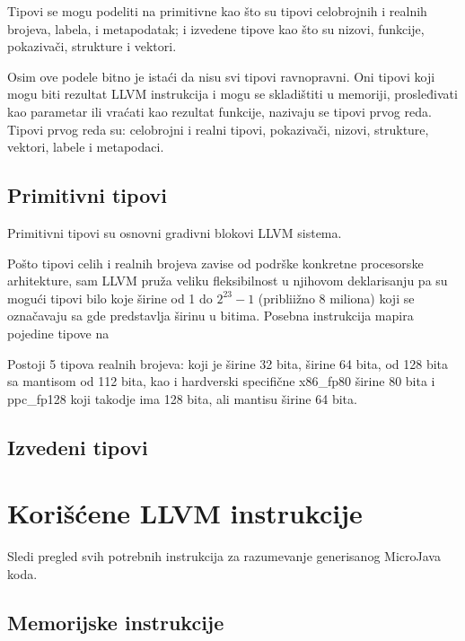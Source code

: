 Tipovi se mogu podeliti na primitivne kao što su tipovi celobrojnih i realnih brojeva, labela, i metapodatak; 
i izvedene tipove kao što su nizovi, funkcije, pokazivači, strukture i vektori.

Osim ove podele bitno je istaći da nisu svi tipovi ravnopravni.
Oni tipovi koji mogu biti rezultat LLVM instrukcija i mogu se skladištiti u memoriji, prosleđivati kao parametar ili vraćati kao rezultat funkcije, nazivaju se tipovi prvog reda. Tipovi prvog reda su: celobrojni i realni tipovi, pokazivači, nizovi, strukture, vektori, labele i metapodaci.


\subsection*{Primitivni tipovi}

Primitivni tipovi su osnovni gradivni blokovi LLVM sistema.

Pošto tipovi celih i realnih brojeva zavise od podrške konkretne procesorske arhitekture,
sam LLVM pruža veliku fleksibilnost u njihovom deklarisanju
pa su mogući tipovi bilo koje širine od 1 do $2^{23} - 1$ (pribliižno 8 miliona) koji se označavaju sa  gde  predstavlja širinu u bitima. Posebna instrukcija mapira pojedine tipove na 

Postoji 5 tipova realnih brojeva: 
 koji je širine 32 bita, 
 širine 64 bita, 
 od 128 bita sa mantisom od 112 bita, 
kao i hardverski specifične x86\_{}fp80 širine 80 bita 
i ppc\_{}fp128 koji takodje ima 128 bita, ali mantisu širine 64 bita.


\subsection*{Izvedeni tipovi}





\section{Korišćene LLVM instrukcije}

Sledi pregled svih potrebnih instrukcija za razumevanje generisanog MicroJava koda.

\subsection*{Memorijske instrukcije}

